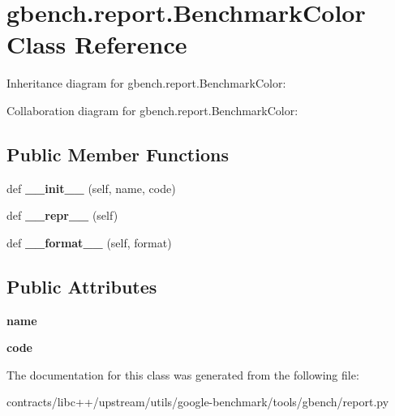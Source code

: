 \hypertarget{classgbench_1_1report_1_1_benchmark_color}{}\section{gbench.\+report.\+Benchmark\+Color Class Reference}
\label{classgbench_1_1report_1_1_benchmark_color}


Inheritance diagram for gbench.\+report.\+Benchmark\+Color\+:


Collaboration diagram for gbench.\+report.\+Benchmark\+Color\+:
\subsection*{Public Member Functions}
\begin{DoxyCompactItemize}
\item 
\mbox{\label{classgbench_1_1report_1_1_benchmark_color_a9a6129486a1f504958f66f5c6c41344d}} 
def {\bfseries \+\_\+\+\_\+init\+\_\+\+\_\+} (self, name, code)
\item 
\mbox{\label{classgbench_1_1report_1_1_benchmark_color_a9edfd81e3baf77ede16f6d1be3b88186}} 
def {\bfseries \+\_\+\+\_\+repr\+\_\+\+\_\+} (self)
\item 
\mbox{\label{classgbench_1_1report_1_1_benchmark_color_a0bbb718bc23636dc9a552093f62cd910}} 
def {\bfseries \+\_\+\+\_\+format\+\_\+\+\_\+} (self, format)
\end{DoxyCompactItemize}
\subsection*{Public Attributes}
\begin{DoxyCompactItemize}
\item 
\mbox{\label{classgbench_1_1report_1_1_benchmark_color_ad893f2df34ac233e2a06020d96e91057}} 
{\bfseries name}
\item 
\mbox{\label{classgbench_1_1report_1_1_benchmark_color_a6a9b3795c8dff76df2523a4800f092e4}} 
{\bfseries code}
\end{DoxyCompactItemize}


The documentation for this class was generated from the following file\+:\begin{DoxyCompactItemize}
\item 
contracts/libc++/upstream/utils/google-\/benchmark/tools/gbench/report.\+py\end{DoxyCompactItemize}
